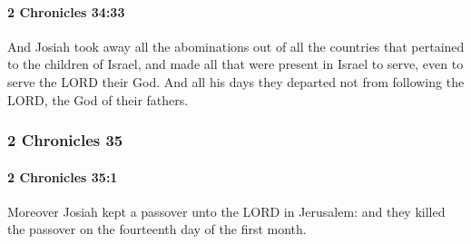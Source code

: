 		\paragraph{2 Chronicles 34:33} %
			\label{2CHRONICLES-34-33}

			And Josiah took away all the abominations out of all the countries that pertained to the children of Israel, and made all that were present in Israel to serve, even to serve the LORD their God. And all his days they departed not from following the LORD, the God of their fathers.

	\subsubsection{2 Chronicles 35} %
		\label{2CHRONICLES-35}

		\paragraph{2 Chronicles 35:1} %
			\label{2CHRONICLES-35-1}

			Moreover Josiah kept a passover unto the LORD in Jerusalem: and they killed the passover on the fourteenth day of the first month.

